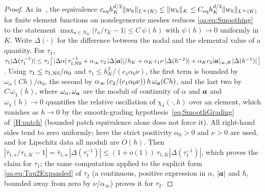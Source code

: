 \begin{proof}
As in~\cite[Lemma~2]{codina2008analysis}, the equivalence
$c_{\mathrm{eq}} h_K^{d/2}\lVert w_h \rVert_{L^\infty(K)} \le \lVert w_h \rVert_{K} \le
C_{\mathrm{eq}} h_K^{d/2}\lVert w_h \rVert_{L^\infty(K)}$ for finite element functions on nondegenerate
meshes reduces \cref{oa:eq:Smoothing} to the statement
$\max_{a\in N_K} |\bar\tau_a/\tau_K - 1| \le C\,\psi(h)$ with $\psi(h)\to 0$
uniformly in $K$. Write $\Delta(\cdot)$ for the difference between the nodal and the
elemental value of a quantity. For $\tau_1$,
$\tau_{1}|\Delta(\tau_1^{-1})| \le
\tau_1\bigl[\,|\Delta\alpha|\,\tau_{1,\mathrm{NS}}^{-1}
+ \alpha_\infty\, c_2\,|\Delta|\boldsymbol{a}||/h_K
+ \alpha_K\, c_1\nu\,|\Delta(h^{-2})| + \alpha_K c_2 |\boldsymbol{a}|_{\infty,K}|\Delta(h^{-1})|\,\bigr]$.
Using $\tau_1 \le \tau_{1,\mathrm{NS}}/\alpha_0$ and $\tau_1 \le h_K^2/(c_1\alpha_0\nu)$,
the first term is bounded by $\omega_\alpha(Ch)/\alpha_0$, the second by
$\alpha_\infty\,(c_2/(c_1\alpha_0\nu))\,h\,\omega_{\boldsymbol{a}}(Ch)$, and the last two by
$C\,\omega_{\chi}(h)$, where $\omega_\alpha, \omega_{\boldsymbol{a}}$ are the moduli of
continuity of $\alpha$ and $\boldsymbol{a}$ and $\omega_\chi(h)\to 0$ quantifies the relative
oscillation of $\chi_1(\cdot,h)$ over an element, which vanishes as $h \to 0$ by the
smooth{\hyp}grading hypothesis~\cref{eq:SmoothGrading} of~\cref{H:patch} (bounded patch
equivalence alone does not force it). All right-hand sides tend to zero
uniformly; here the strict positivity $\alpha_0 > 0$ and $\nu > 0$ are used, and for
Lipschitz data all moduli are $O(h)$. Then
$|\bar\tau_{1,a}/\tau_{1,K} - 1| = \bar\tau_{1,a}\,|\Delta(\tau_1^{-1})|
\le (1+o(1))\,\tau_{1,K}|\Delta(\tau_1^{-1})|$, which proves the claim for $\tau_1$;
the same computation applied to the explicit form \cref{oa:eq:Tau2Expanded} of $\tau_2$
(a continuous, positive expression in $\alpha$, $|\boldsymbol{a}|$ and $h$, bounded away from
zero by $\nu/\alpha_\infty$) proves it for $\tau_2$.
\end{proof}

